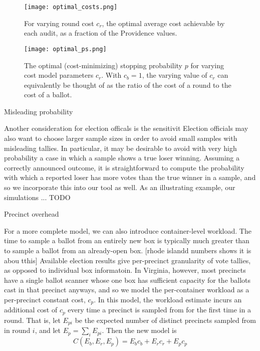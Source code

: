 \begin{figure}
\texttt{[image: optimal\_costs.png]}
\caption{For varying round cost $c_r$, the optimal average cost achievable by each audit, as a fraction of the Providence values.}
\label{fig:optimal_costs}
\end{figure}

\begin{figure}
\texttt{[image: optimal\_ps.png]}
\caption{The optimal (cost-minimizing) stopping probability $p$ for varying cost model parameters $c_r$. With $c_b=1$, the varying value of $c_r$ can equivalently be thought of as the ratio of the cost of a round to the cost of a ballot.}
\label{fig:optimal_ps}
\end{figure}

Misleading probability

Another consideration for election officals is the sensitivit
Election officials may also want to choose larger sample sizes in order to avoid small samples with misleading tallies. In particular, it may be desirable to avoid with very high probability a case in which a sample shows a true loser winning. Assuming a correctly announced outcome, it is straightforward to compute the probability with which a reported loser has more votes than the true winner in a sample, and so we incorporate this into our tool as well. As an illustrating example, our simulations ... TODO

Precinct overhead

For a more complete model, we can also introduce container-level workload. The time to sample a ballot from an entirely new box is typically much greater than to sample a ballot from an already-open box. [rhode islandd numbers shows it is abou tthis] Available election results give per-precinct granularity of vote tallies, as opposed to individual box informatoin. In Virginia, however, most precincts have a single ballot scanner whose one box has sufficient capacity for the ballots cast in that precinct anyways, and so we model the per-container workload as a per-precinct constant cost, $c_p$. In this model, the workload estimate incurs an additional cost of $c_p$ every time a precinct is sampled from for the first time in a round. That is, let $E_{pi}$ be the expected number of distinct precincts sampled from in round $i$, and let $E_p=\sum_i E_{pi}$. Then the new model is
\begin{equation}
C(E_b, E_r, E_p) = E_b c_b + E_r c_r + E_p c_p
\label{eq:round_and_precinct_cost}
\end{equation}

